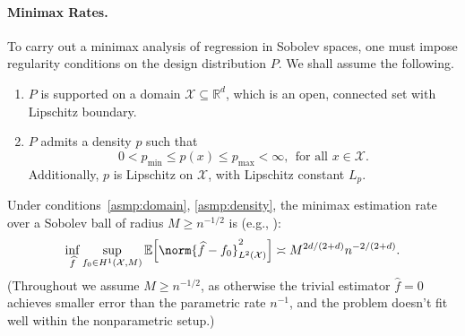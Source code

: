 \documentclass[twoside]{article}
\newcommand{\red}[1]{\textcolor{red}{#1}}
\newcommand{\green}[1]{\textcolor{green}{#1}}
\newcommand{\sbcomment}[1]{{\bf{{\red{{SB --- #1}}}}}}
\newcommand{\agcomment}[1]{{\bf{{\green{{AG --- #1}}}}}}
\newcommand{\Reals}{\mathbb{R}}
\newcommand{\1}{\mathbf{1}}
\newcommand{\Rd}{\Reals^d}
\newcommand{\Xset}{\mathcal{X}}
\newcommand{\Ebb}{\mathbb{E}}
\newcommand{\wh}[1]{\widehat{#1}}
\theoremstyle{definition}
\theoremstyle{remark}
\begin{document}
\paragraph{Minimax Rates.}

To carry out a minimax analysis of regression in Sobolev spaces, one must impose regularity conditions on the design distribution $P$. We shall assume the following.
\begin{enumerate}[label=(P\arabic*)]
	\item
	\label{asmp:domain}
	$P$ is supported on a domain $\Xset \subseteq \Rd$, which is an open, connected set with Lipschitz boundary.
	\item
	\label{asmp:density} 
	$P$ admits a density $p$ such that
	\begin{equation*}
	0 < p_{\min} \leq p(x) \leq p_{\max} < \infty, ~~\textrm{for all $x \in \Xset$}.
	\end{equation*}
	Additionally, $p$ is Lipschitz on $\Xset$, with Lipschitz constant $L_p$.
\end{enumerate}

Under conditions~\ref{asmp:domain}, \ref{asmp:density}, the minimax estimation rate over a Sobolev ball of radius $M \geq n^{-1/2}$ is (e.g., \citet{tsybakov2008_book}):
\begin{equation}
\label{eqn:sobolev_space_estimation_minimax_rate}
\inf_{\wh{f}} \sup_{f_0 \in H^1(\Xset, M)} \Ebb\Bigl[\norm{\wh{f} - f_0}_{L^2(\Xset)}^2\Bigr] \asymp M^{2d/(2 + d)} n^{-2/(2 + d)}.
\end{equation}
(Throughout we assume $M \geq n^{-1/2}$, as otherwise the trivial estimator $\wh{f} = 0$ achieves smaller error than the parametric rate $n^{-1}$, and the problem doesn't fit well within the nonparametric setup.) 
\end{document}
